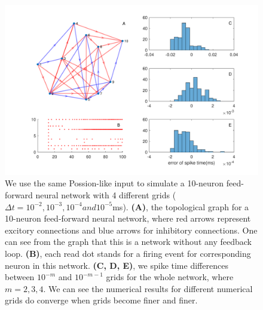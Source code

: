 \documentclass[10pt]{article}
\begin{document}
\begin{figure}
\includegraphics[width=\textwidth]{G_based_feedforward.pdf}
\caption{\color{Gray}We use the same Possion-like input to simulate a 10-neuron feed-forward neural network with 4 different grids ($\Delta t = 10^{-2},10^{-3},10^{-4} and 10^{-5}$ms). \textbf{(A)}, the topological graph for a 10-neuron feed-forward neural network, where red arrows represent excitory connections and blue arrows for inhibitory connections.  One can see from the graph that this is a network without any feedback loop. \textbf{(B)}, each read dot stands for a firing event for corresponding neuron in this network. \textbf{(C, D, E)}, we  spike time differences between $10^{-m}$ and $10^{-m-1}$ grids for the whole network, where $m = 2,3,4$. We can see the numerical results for different numerical grids do converge when grids become finer and finer.} 
\label{G_based_feedforward} %
\end{figure}
\begin{multicols}{2}

\newpage

\end{multicols}
\end{document}
